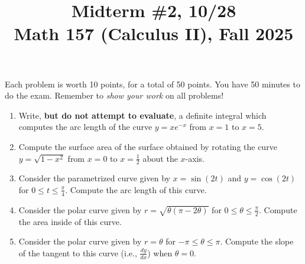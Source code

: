 \documentclass[11pt]{article}
\title{Midterm \#2, 10/28 \\ Math 157 (Calculus II), Fall 2025}
\date{}
\begin{document}
\maketitle

\thispagestyle{empty}

\vspace{-1cm}

Each problem is worth 10 points, for a total of 50 points. You have 50 minutes to do the exam. Remember to \emph{show your work} on all problems!

\begin{enumerate}
\item Write, {\bf but do not attempt to evaluate}, a definite integral which computes the arc length of the curve $y=xe^{-x}$ from $x=1$ to $x=5$.
\item Compute the surface area of the surface obtained by rotating the curve $y=\sqrt{1-x^2}$ from $x=0$ to $x=\frac{1}{2}$ about the $x$-axis.
\item Consider the parametrized curve given by $x=\sin(2t)$ and $y=\cos(2t)$ for $0\leq t \leq \frac{\pi}{4}$. Compute the arc length of this curve.
\item Consider the polar curve given by $r=\sqrt{\theta (\pi-2\theta)}$ for $0 \leq \theta \leq \frac{\pi}{2}$. Compute the area inside of this curve.
\item Consider the polar curve given by $r=\theta$ for $-\pi \leq \theta \leq \pi$. Compute the slope of the tangent to this curve (i.e., $\frac{dy}{dx}$) when $\theta=0$.
\end{enumerate}
\end{document}
